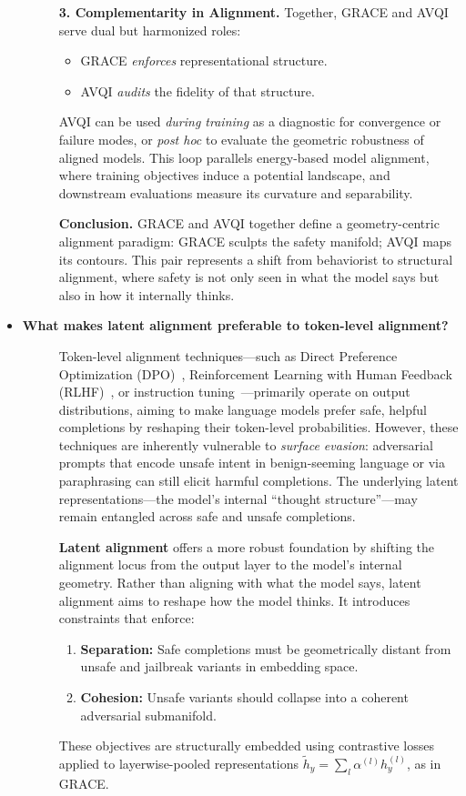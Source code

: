 \begin{itemize}[leftmargin=15pt,nolistsep]
\begin{description}
\medskip
\textbf{3. Complementarity in Alignment.}  
Together, GRACE and AVQI serve dual but harmonized roles:
\begin{itemize}[leftmargin=1.5em, itemsep=1pt]
\item GRACE \textit{enforces} representational structure.
\item AVQI \textit{audits} the fidelity of that structure.
\end{itemize}
AVQI can be used \textit{during training} as a diagnostic for convergence or failure modes, or \textit{post hoc} to evaluate the geometric robustness of aligned models. This loop parallels energy-based model alignment, where training objectives induce a potential landscape, and downstream evaluations measure its curvature and separability.

\medskip
\textbf{Conclusion.}  
GRACE and AVQI together define a geometry-centric alignment paradigm: GRACE sculpts the safety manifold; AVQI maps its contours. This pair represents a shift from behaviorist to structural alignment, where safety is not only seen in what the model says but also in how it internally thinks.
\end{description}


\item[\ding{93}] { \selectfont \textbf{What makes latent alignment preferable to token-level alignment?}}
\begin{description}
\item[]
Token-level alignment techniques—such as Direct Preference Optimization (DPO)~\cite{rafailov2023direct}, Reinforcement Learning with Human Feedback (RLHF)~\cite{ouyang2022training}, or instruction tuning~\cite{wei2022finetuned}—primarily operate on output distributions, aiming to make language models prefer safe, helpful completions by reshaping their token-level probabilities. However, these techniques are inherently vulnerable to \emph{surface evasion}: adversarial prompts that encode unsafe intent in benign-seeming language or via paraphrasing can still elicit harmful completions. The underlying latent representations—the model’s internal “thought structure”—may remain entangled across safe and unsafe completions.

\medskip
\textbf{Latent alignment} offers a more robust foundation by shifting the alignment locus from the output layer to the model’s internal geometry. Rather than aligning with what the model says, latent alignment aims to reshape how the model thinks. It introduces constraints that enforce:
\begin{enumerate}[leftmargin=1.2em, itemsep=2pt]
    \item \textbf{Separation:} Safe completions must be geometrically distant from unsafe and jailbreak variants in embedding space.
    \item \textbf{Cohesion:} Unsafe variants should collapse into a coherent adversarial submanifold.
\end{enumerate}
These objectives are structurally embedded using contrastive losses applied to layerwise-pooled representations \(\tilde{h}_y = \sum_l \alpha^{(l)} h_y^{(l)}\), as in GRACE.


\end{description}
\end{itemize}

